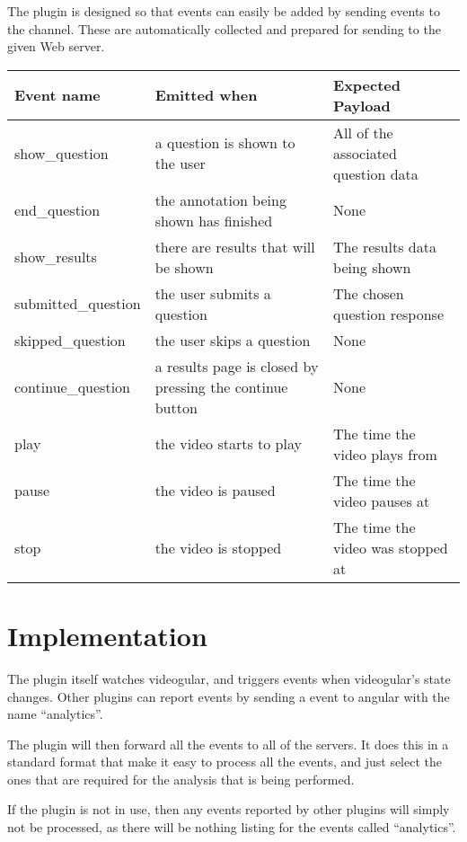 The plugin is designed so that events can easily be added by sending events to the  channel. These are automatically collected and prepared for sending to the given Web server.

\begin{tabular}{p{3.2cm} p{6cm} p{4cm}}
\caption{\label{Table:analytics_api}API of the emitted analytics events and their data payload}
\textbf{Event name} & \textbf{Emitted when} & \textbf{Expected Payload} \\
\hline
show\_question & a question is shown to the user & All of the associated question data \\
\hline
end\_question & the annotation being shown has finished & None \\
\hline
show\_results & there are results that will be shown & The results data being shown \\
\hline
submitted\_question & the user submits a question & The chosen question response \\
\hline
skipped\_question & the user skips a question & None \\
\hline
continue\_question & a results page is closed by pressing the continue button & None \\
\hline
play & the video starts to play & The time the video plays from \\
\hline
pause & the video is paused & The time the video pauses at \\
\hline
stop & the video is stopped & The time the video was stopped at \\
\end{tabular}

\section{Implementation}

The plugin itself watches videogular, and triggers events when videogular's state changes. Other plugins can report events by sending a event to angular with the name ``analytics''.

The plugin will then forward all the events to all of the servers. It does this in a standard format that make it easy to process all the events, and just select the ones that are required for the analysis that is being performed.

If the plugin is not in use, then any events reported by other plugins will simply not be processed, as there will be nothing listing for the events called ``analytics''.

